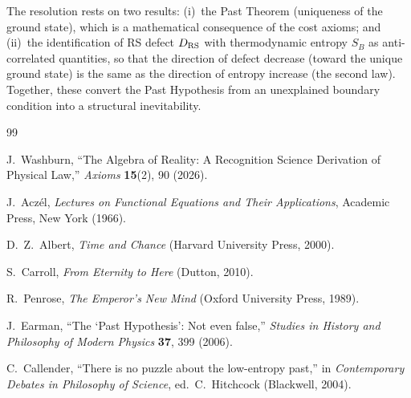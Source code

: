 \documentclass[12pt,a4paper]{article}
\theoremstyle{definition}
\theoremstyle{remark}
\begin{document}
The resolution rests on two results: (i)~the Past Theorem (uniqueness
of the ground state), which is a mathematical consequence of the cost
axioms; and (ii)~the identification of RS defect $D_{\rm RS}$ with
thermodynamic entropy $S_B$ as anti-correlated quantities, so that
the direction of defect decrease (toward the unique ground state) is
the same as the direction of entropy increase (the second law).
Together, these convert the Past Hypothesis from an unexplained
boundary condition into a structural inevitability.

\begin{thebibliography}{99}

J.~Washburn, ``The Algebra of Reality: A Recognition Science Derivation
of Physical Law,'' \emph{Axioms} \textbf{15}(2), 90 (2026).

J.~Acz\'el, \textit{Lectures on Functional Equations and Their Applications},
Academic Press, New York (1966).

D.~Z.~Albert, \emph{Time and Chance} (Harvard University Press, 2000).

S.~Carroll, \emph{From Eternity to Here} (Dutton, 2010).

R.~Penrose, \emph{The Emperor's New Mind} (Oxford University Press, 1989).

J.~Earman, ``The `Past Hypothesis': Not even false,''
\emph{Studies in History and Philosophy of Modern Physics}
\textbf{37}, 399 (2006).

C.~Callender, ``There is no puzzle about the low-entropy past,'' in
\emph{Contemporary Debates in Philosophy of Science}, ed.\ C.~Hitchcock
(Blackwell, 2004).

\end{thebibliography}
\end{document}
